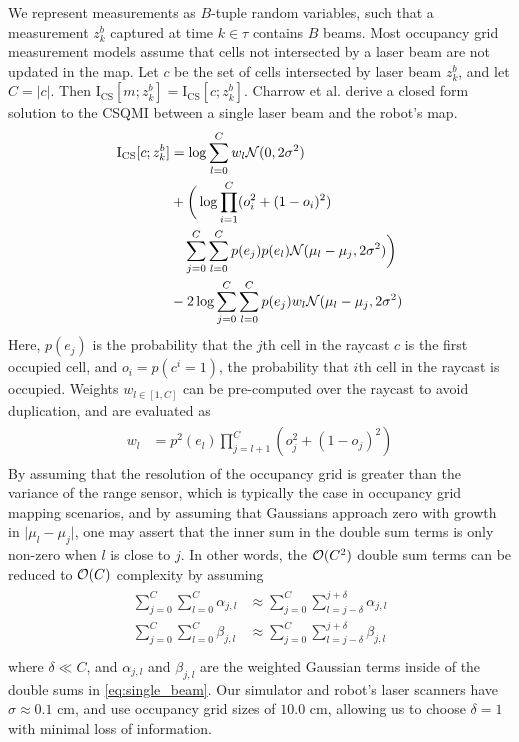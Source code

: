 We represent measurements as $B$-tuple random variables, such that a measurement
$z_{k}^{b}$ captured at time $k \in \tau$ contains $B$ beams. Most occupancy grid
measurement models assume that cells not intersected
by a laser beam are not updated in the map. Let $c$ be the set of cells
intersected by laser beam $z_{k}^{b}$, and let $C = \vert c \vert$. Then
$\text{I}_{\text{CS}}[m; z_{k}^{b}] =
\text{I}_{\text{CS}}[c; z_{k}^{b}]$. Charrow et al. \cite{charrow15} derive a closed form
solution to the CSQMI between
a single laser beam and the robot's map.
%
\begin{align}
  \begin{split}
    \text{I}_{\text{CS}}
    [
      c;
      z_{k}^{b}
    ]
    &=
    \log
    \sum_{l=0}^{C} w_{l}
    \mc{N}(0, 2\sigma^{2}) \\
    &+ \bigg(\log
    \prod_{i=1}^{C}
    (o_{i}^{2} + (1 - o_{i})^{2}) \\
    &\ \ \ \sum_{j=0}^{C}
    \sum_{l=0}^{C}
    p(e_{j})
    p(e_{l})
    \mc{N}(\mu_{l} - \mu_{j}, 2\sigma^{2}) \bigg)\\
    &-2\log
    \sum_{j=0}^{C}
    \sum_{l=0}^{C}
    p(e_{j}) w_{l}
    \mc{N}(\mu_{l} - \mu_{j}, 2\sigma^{2})
    \label{eq:single_beam}
  \end{split}
\end{align}
%
Here, $p(e_j)$ is the probability that the $j$th cell in the raycast $c$ is the
first occupied cell, and $o_i = p(c^{i} = 1)$, the probability that $i$th cell
in the raycast is occupied. Weights $w_{l \in [1, C]}$ can be pre-computed over
the raycast to avoid duplication, and are evaluated as
%
\begin{align}
  \begin{split}
    w_{l} &=
    p^{2}(e_{l})
    \prod_{j=l+1}^{C}
    (o_{j}^{2} + (1 - o_{j})^{2})
  \end{split}
\end{align}
%
By assuming that the resolution of the occupancy grid is greater than the
variance of the range sensor, which is typically the case in occupancy grid
mapping scenarios, and by assuming that Gaussians approach zero with growth in $\vert \mu_{l} -
\mu_{j} \vert$, one may assert that the inner sum in the double sum terms is
only non-zero when $l$ is close to $j$. In other words, the $\mathcal{O}(C^2)$ double
sum terms can be reduced to $\mathcal{O}(C)$ complexity by assuming
%
\begin{align}
  \begin{split}
    \sum_{j=0}^{C}
    \sum_{l=0}^{C}
    \alpha_{j, l}
    &\approx
    \sum_{j=0}^{C}
    \sum_{l=j-\delta}^{j+\delta}
    \alpha_{j, l} \\
    \sum_{j=0}^{C}
    \sum_{l=0}^{C}
    \beta_{j, l}
    &\approx
    \sum_{j=0}^{C}
    \sum_{l=j-\delta}^{j+\delta}
    \beta_{j, l}\\
  \end{split}
\end{align}
%
where $\delta \ll C$, and $\alpha_{j,l}$ and $\beta_{j, l}$ are the weighted Gaussian terms inside
of the double sums in \eqref{eq:single_beam}. Our simulator and robot's
laser scanners have $\sigma \approx 0.1$ cm, and use occupancy grid sizes of
$10.0$ cm, allowing us to choose $\delta = 1$ with minimal loss of information.

